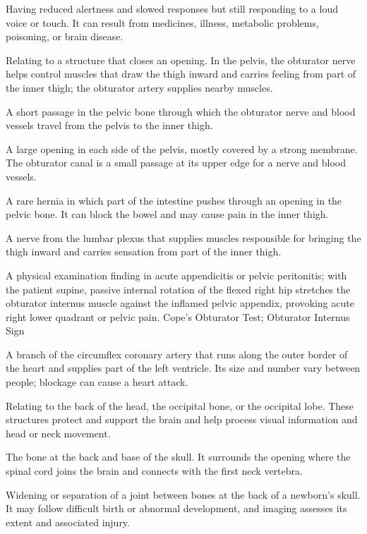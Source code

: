  Having reduced alertness and slowed responses but still responding to a loud voice or touch. It can result from medicines, illness, metabolic problems, poisoning, or brain disease.

 Relating to a structure that closes an opening. In the pelvis, the obturator nerve helps control muscles that draw the thigh inward and carries feeling from part of the inner thigh; the obturator artery supplies nearby muscles.

 A short passage in the pelvic bone through which the obturator nerve and blood vessels travel from the pelvis to the inner thigh.

 A large opening in each side of the pelvis, mostly covered by a strong membrane. The obturator canal is a small passage at its upper edge for a nerve and blood vessels.

 A rare hernia in which part of the intestine pushes through an opening in the pelvic bone. It can block the bowel and may cause pain in the inner thigh.

 A nerve from the lumbar plexus that supplies muscles responsible for bringing the thigh inward and carries sensation from part of the inner thigh.

 A physical examination finding in acute appendicitis or pelvic peritonitis; with the patient supine, passive internal rotation of the flexed right hip stretches the obturator internus muscle against the inflamed pelvic appendix, provoking acute right lower quadrant or pelvic pain.
\synonyms
Cope's Obturator Test; Obturator Internus Sign

 A branch of the circumflex coronary artery that runs along the outer border of the heart and supplies part of the left ventricle. Its size and number vary between people; blockage can cause a heart attack.

 Relating to the back of the head, the occipital bone, or the occipital lobe. These structures protect and support the brain and help process visual information and head or neck movement.

 The bone at the back and base of the skull. It surrounds the opening where the spinal cord joins the brain and connects with the first neck vertebra.

 Widening or separation of a joint between bones at the back of a newborn’s skull. It may follow difficult birth or abnormal development, and imaging assesses its extent and associated injury.

